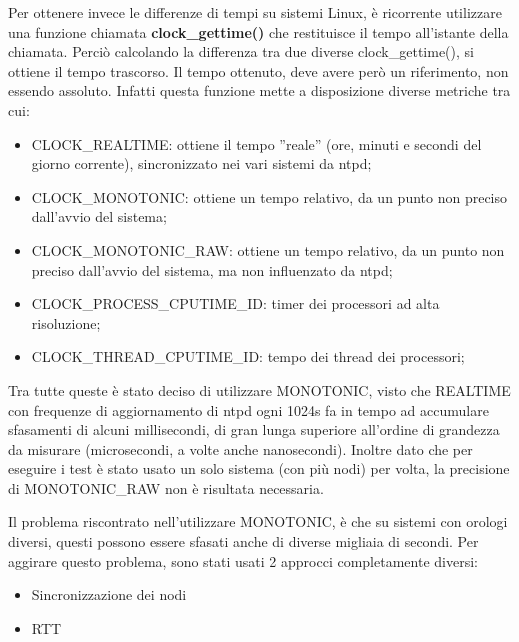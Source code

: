 Per ottenere invece le differenze di tempi su sistemi Linux, è ricorrente utilizzare una funzione chiamata \textbf{clock\_gettime()} che restituisce il tempo all'istante della chiamata. Perciò calcolando la differenza tra due diverse clock\_gettime(), si ottiene il tempo trascorso. Il tempo ottenuto, deve avere però un riferimento, non essendo assoluto. Infatti questa funzione mette a disposizione diverse metriche tra cui:
\begin{itemize}
    \item CLOCK\_REALTIME: ottiene il tempo ''reale'' (ore, minuti e secondi del giorno corrente), sincronizzato nei vari sistemi da ntpd;
    \item CLOCK\_MONOTONIC: ottiene un tempo relativo, da un punto non preciso dall'avvio del sistema;
    \item CLOCK\_MONOTONIC\_RAW: ottiene un tempo relativo, da un punto non preciso dall'avvio del sistema, ma non influenzato da ntpd;
    \item CLOCK\_PROCESS\_CPUTIME\_ID: timer dei processori ad alta risoluzione;
    \item CLOCK\_THREAD\_CPUTIME\_ID: tempo dei thread dei processori;
\end{itemize}
Tra tutte queste è stato deciso di utilizzare MONOTONIC, visto che REALTIME con frequenze di aggiornamento di ntpd ogni 1024s fa in tempo ad accumulare sfasamenti di alcuni millisecondi\cite{ntpd}, di gran lunga superiore all'ordine di grandezza da misurare (microsecondi, a volte anche nanosecondi). Inoltre dato che per eseguire i test è stato usato un solo sistema (con più nodi) per volta, la precisione di MONOTONIC\_RAW non è risultata necessaria.

Il problema riscontrato nell'utilizzare  MONOTONIC, è che su sistemi con orologi diversi, questi possono essere sfasati anche di diverse migliaia di secondi. Per aggirare questo problema, sono stati usati 2 approcci completamente diversi:
\begin{itemize}
    \item Sincronizzazione dei nodi
    \item RTT
\end{itemize} 

